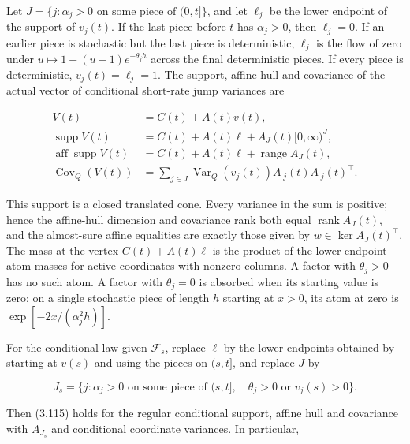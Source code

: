 \documentclass[11pt]{article}
\begin{document}
Let \(J=\{j:\alpha_j>0\text{ on some piece of }(0,t]\}\), and let \(\ell_j\) be the lower endpoint of the support of \(v_j(t)\). If the last piece before \(t\) has \(\alpha_j>0\), then \(\ell_j=0\). If an earlier piece is stochastic but the last piece is deterministic, \(\ell_j\) is the flow of zero under \(u\mapsto1+(u-1)e^{-\theta_j h}\) across the final deterministic pieces. If every piece is deterministic, \(v_j(t)=\ell_j=1\). The support, affine hull and covariance of the actual vector of conditional short-rate jump variances are

\begin{equation*}
\begin{aligned}
V(t)&=C(t)+A(t)v(t),\\
\operatorname{supp}V(t)&=C(t)+A(t)\ell+A_J(t)[0,\infty)^J,\\
\operatorname{aff}\operatorname{supp}V(t)&=C(t)+A(t)\ell+\operatorname{range}A_J(t),\\
\operatorname{Cov}_Q(V(t))&=\sum_{j\in J}\operatorname{Var}_Q(v_j(t))A_{\cdot j}(t)A_{\cdot j}(t)^\top .
\end{aligned} \tag{3.115}\label{eq:3.115}
\end{equation*}

This support is a closed translated cone. Every variance in the sum is positive; hence the affine-hull dimension and covariance rank both equal \(\operatorname{rank}A_J(t)\), and the almost-sure affine equalities are exactly those given by \(w\in\ker A_J(t)^\top\). The mass at the vertex \(C(t)+A(t)\ell\) is the product of the lower-endpoint atom masses for active coordinates with nonzero columns. A factor with \(\theta_j>0\) has no such atom. A factor with \(\theta_j=0\) is absorbed when its starting value is zero; on a single stochastic piece of length \(h\) starting at \(x>0\), its atom at zero is \(\exp[-2x/(\alpha_j^2h)]\).

For the conditional law given \(\mathcal F_s\), replace \(\ell\) by the lower endpoints obtained by starting at \(v(s)\) and using the pieces on \((s,t]\), and replace \(J\) by

\begin{equation*}
J_s=\{j:\alpha_j>0\text{ on some piece of }(s,t],\quad \theta_j>0\text{ or }v_j(s)>0\}. \tag{3.116}\label{eq:3.116}
\end{equation*}

Then (3.115) holds for the regular conditional support, affine hull and covariance with \(A_{J_s}\) and conditional coordinate variances. In particular,
\end{document}
